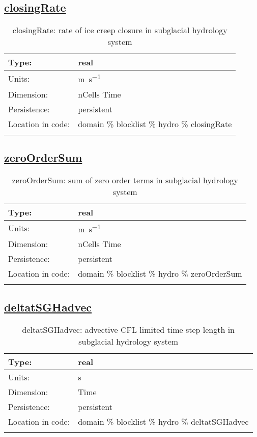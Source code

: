 \subsection[closingRate]{\hyperref[sec:var_tab_hydro]{closingRate}}
\label{subsec:var_sec_hydro_closingRate}
\begin{center}
\begin{longtable}{| p{2.0in} | p{4.0in} |}
        \hline 
        Type: & real \\
        \hline 
        Units: & \si{m.s^{-1}} \\
        \hline 
        Dimension: & nCells Time \\
        \hline 
        Persistence: & persistent \\
        \hline 
         Location in code: & domain \% blocklist \% hydro \% closingRate \\
         \hline 
    \caption{closingRate: rate of ice creep closure in subglacial hydrology system}
\end{longtable}
\end{center}
\subsection[zeroOrderSum]{\hyperref[sec:var_tab_hydro]{zeroOrderSum}}
\label{subsec:var_sec_hydro_zeroOrderSum}
\begin{center}
\begin{longtable}{| p{2.0in} | p{4.0in} |}
        \hline 
        Type: & real \\
        \hline 
        Units: & \si{m.s^{-1}} \\
        \hline 
        Dimension: & nCells Time \\
        \hline 
        Persistence: & persistent \\
        \hline 
         Location in code: & domain \% blocklist \% hydro \% zeroOrderSum \\
         \hline 
    \caption{zeroOrderSum: sum of zero order terms in subglacial hydrology system}
\end{longtable}
\end{center}
\subsection[deltatSGHadvec]{\hyperref[sec:var_tab_hydro]{deltatSGHadvec}}
\label{subsec:var_sec_hydro_deltatSGHadvec}
\begin{center}
\begin{longtable}{| p{2.0in} | p{4.0in} |}
        \hline 
        Type: & real \\
        \hline 
        Units: & \si{s} \\
        \hline 
        Dimension: & Time \\
        \hline 
        Persistence: & persistent \\
        \hline 
         Location in code: & domain \% blocklist \% hydro \% deltatSGHadvec \\
         \hline 
    \caption{deltatSGHadvec: advective CFL limited time step length in subglacial hydrology system}
\end{longtable}
\end{center}
